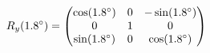 \documentclass[preview]{standalone}
\begin{document}
\begin{align*}
\special{dvisvgm:raw <g id='unique000'>}R_y(1.8^\circ) = \begin{pmatrix} \cos(1.8^\circ) & 0 & -\sin(1.8^\circ) \\ 0 & 1 & 0 \\ \sin(1.8^\circ) & 0 & \cos(1.8^\circ) \end{pmatrix}\special{dvisvgm:raw </g>}
\end{align*}
\end{document}
